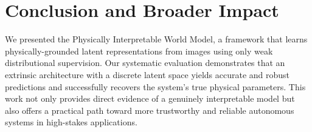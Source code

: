 \documentclass[sigconf]{acmart}
\begin{document}

\section{Conclusion and Broader Impact}\label{sec:conclusion}
We presented the Physically Interpretable World Model, a framework that learns physically-grounded latent representations from images using only weak distributional supervision. Our systematic evaluation demonstrates that an extrinsic architecture with a discrete latent space yields accurate and robust predictions and successfully recovers the system's true physical parameters. This work not only provides direct evidence of a genuinely interpretable model but also offers a practical path toward more trustworthy and reliable autonomous systems in high-stakes applications. 


















\end{document}
